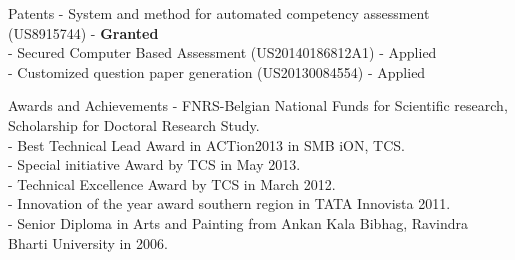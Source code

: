 \documentclass{resume} %
\begin{document}
\begin{rSection}{Patents}
- System and method for automated competency assessment (US8915744) - \textbf{Granted}\\ %
- Secured Computer Based Assessment (US20140186812A1) - Applied\\ %
- Customized question paper generation (US20130084554) - Applied %
\end{rSection}
\begin{rSection}{Awards and Achievements}
- FNRS-Belgian National Funds for Scientific research, Scholarship for Doctoral Research Study.\\
- Best Technical Lead Award in ACTion2013 in SMB iON, TCS. \\
- Special initiative Award by TCS in May 2013.\\
- Technical Excellence Award by TCS in March 2012.\\
- Innovation of the year award southern region in TATA Innovista 2011.\\
- Senior Diploma in Arts and Painting from Ankan Kala Bibhag, Ravindra Bharti University in 2006.\\
\end{rSection}
\iffalse


\break


\fi
\end{document}
